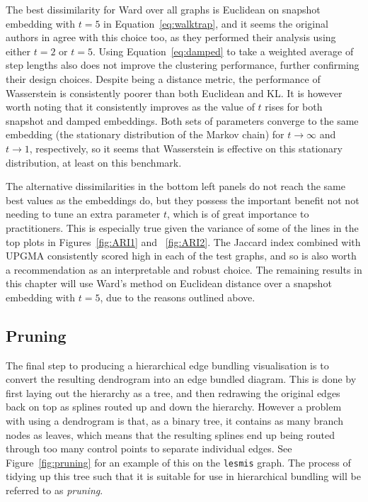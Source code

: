 The best dissimilarity for Ward over all graphs is Euclidean on snapshot embedding with $t=5$ in Equation~\eqref{eq:walktrap}, and it seems the original authors in \cite{Pons2006} agree with this choice too, as they performed their analysis using either $t=2$ or $t=5$.
Using Equation~\ref{eq:damped} to take a weighted average of step lengths also does not improve the clustering performance, further confirming their design choices.
Despite being a distance metric, the performance of Wasserstein is consistently poorer than both Euclidean and KL. It is however worth noting that it consistently improves as the value of $t$ rises for both snapshot and damped embeddings. Both sets of parameters converge to the same embedding (the stationary distribution of the Markov chain) for $t\rightarrow \infty$ and $t\rightarrow 1$, respectively, so it seems that Wasserstein is effective on this stationary distribution, at least on this benchmark.

The alternative dissimilarities in the bottom left panels do not reach the same best values as the embeddings do, but they possess the important benefit not not needing to tune an extra parameter $t$, which is of great importance to practitioners. This is especially true given the variance of some of the lines in the top plots in Figures~\ref{fig:ARI1} and ~\ref{fig:ARI2}.
The Jaccard index combined with UPGMA consistently scored high in each of the test graphs, and so is also worth a recommendation as an interpretable and robust choice.
The remaining results in this chapter will use Ward's method on Euclidean distance over a snapshot embedding with $t=5$, due to the reasons outlined above.

\subsection{Pruning}
\label{sec:pruning}
The final step to producing a hierarchical edge bundling visualisation is to convert the resulting dendrogram into an edge bundled diagram. This is done by first laying out the hierarchy as a tree, and then redrawing the original edges back on top as splines routed up and down the hierarchy.
However a problem with using a dendrogram is that, as a binary tree, it contains as many branch nodes as leaves, which means that the resulting splines end up being routed through too many control points to separate individual edges. See Figure~\ref{fig:pruning} for an example of this on the \texttt{lesmis} graph.
The process of tidying up this tree such that it is suitable for use in hierarchical bundling will be referred to as \emph{pruning}. 

